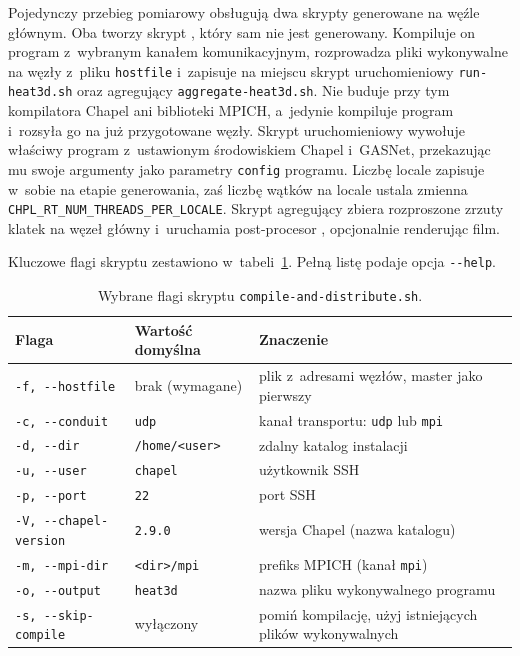 Pojedynczy przebieg pomiarowy obsługują dwa skrypty generowane na węźle głównym. Oba tworzy
skrypt , który sam nie jest generowany. Kompiluje on program
z~wybranym kanałem komunikacyjnym, rozprowadza pliki wykonywalne na węzły z~pliku
\texttt{hostfile} i~zapisuje na miejscu skrypt uruchomieniowy \texttt{run-heat3d.sh} oraz
agregujący \texttt{aggregate-heat3d.sh}. Nie buduje przy tym kompilatora Chapel ani biblioteki
MPICH, a~jedynie kompiluje program i~rozsyła go na już przygotowane węzły.
Skrypt uruchomieniowy wywołuje właściwy program z~ustawionym środowiskiem Chapel i~GASNet,
przekazując mu swoje argumenty jako parametry \texttt{config} programu.
Liczbę locale zapisuje w~sobie na etapie generowania,
zaś liczbę wątków na locale ustala zmienna \texttt{CHPL\_RT\_NUM\_THREADS\_PER\_LOCALE}.
Skrypt agregujący zbiera rozproszone zrzuty klatek na węzeł główny i~uruchamia
post-procesor , opcjonalnie renderując film.

Kluczowe flagi skryptu  zestawiono w~tabeli~\ref{tab:flags}.
Pełną listę podaje opcja \texttt{-{}-help}.

\begin{table}[H]
  \centering
  \caption{Wybrane flagi skryptu \texttt{compile-and-distribute.sh}.}
  \label{tab:flags}
  \small
  \begin{tabular}{@{}>{\raggedright\arraybackslash}p{4.4cm}>{\raggedright\arraybackslash}p{3.2cm}>{\raggedright\arraybackslash}p{6.4cm}@{}}
    \toprule
    Flaga & Wartość domyślna & Znaczenie \\
    \midrule
    \texttt{-f, -{}-hostfile} & brak (wymagane) & plik z~adresami węzłów, master jako pierwszy \\
    \texttt{-c, -{}-conduit}  & \texttt{udp} & kanał transportu: \texttt{udp} lub \texttt{mpi} \\
    \texttt{-d, -{}-dir}      & \texttt{/home/<user>} & zdalny katalog instalacji \\
    \texttt{-u, -{}-user}    & \texttt{chapel} & użytkownik SSH \\
    \texttt{-p, -{}-port}    & \texttt{22} & port SSH \\
    \texttt{-V, -{}-chapel-version} & \texttt{2.9.0} & wersja Chapel (nazwa katalogu) \\
    \texttt{-m, -{}-mpi-dir}  & \texttt{<dir>/mpi} & prefiks MPICH (kanał \texttt{mpi}) \\
    \texttt{-o, -{}-output}   & \texttt{heat3d} & nazwa pliku wykonywalnego programu \\
    \texttt{-s, -{}-skip-compile} & wyłączony & pomiń kompilację, użyj istniejących plików wykonywalnych \\
    \bottomrule
  \end{tabular}
\end{table}

